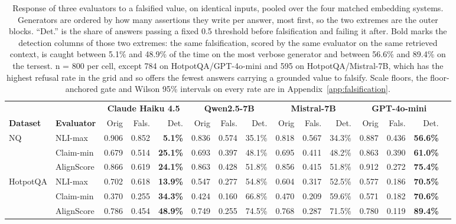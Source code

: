 \documentclass[11pt]{article}
\begin{document}
\begin{table}[t]
\centering
\footnotesize
\setlength{\tabcolsep}{4pt}
\begin{tabular}{llrrrrrrrrrrrrr}
\toprule
 & & \multicolumn{3}{c}{\textbf{Claude Haiku 4.5}} & \multicolumn{3}{c}{\textbf{Qwen2.5-7B}} & \multicolumn{3}{c}{\textbf{Mistral-7B}} & \multicolumn{3}{c}{\textbf{GPT-4o-mini}} \\
\cmidrule(lr){3-5}\cmidrule(lr){6-8}\cmidrule(lr){9-11}\cmidrule(lr){12-14}
\textbf{Dataset} & \textbf{Evaluator} & Orig & Fals. & Det. & Orig & Fals. & Det. & Orig & Fals. & Det. & Orig & Fals. & Det. \\
\midrule
NQ & NLI-max & 0.906 & 0.852 & \textbf{5.1\%} & 0.836 & 0.574 & 35.1\% & 0.818 & 0.567 & 34.3\% & 0.887 & 0.436 & \textbf{56.6\%} \\
 & Claim-min & 0.679 & 0.514 & \textbf{25.1\%} & 0.693 & 0.397 & 48.1\% & 0.695 & 0.411 & 48.2\% & 0.863 & 0.390 & \textbf{61.0\%} \\
 & AlignScore & 0.866 & 0.619 & \textbf{24.1\%} & 0.863 & 0.428 & 51.8\% & 0.856 & 0.415 & 51.8\% & 0.912 & 0.272 & \textbf{75.4\%} \\
\midrule
HotpotQA & NLI-max & 0.702 & 0.618 & \textbf{13.9\%} & 0.547 & 0.277 & 54.8\% & 0.604 & 0.317 & 52.5\% & 0.577 & 0.186 & \textbf{70.5\%} \\
 & Claim-min & 0.370 & 0.255 & \textbf{34.3\%} & 0.424 & 0.160 & 66.8\% & 0.470 & 0.209 & 59.6\% & 0.571 & 0.182 & \textbf{70.6\%} \\
 & AlignScore & 0.786 & 0.454 & \textbf{48.9\%} & 0.749 & 0.255 & 74.5\% & 0.768 & 0.287 & 71.5\% & 0.780 & 0.119 & \textbf{89.4\%} \\
\bottomrule
\end{tabular}
\caption{Response of three evaluators to a falsified value, on identical inputs, pooled over the four matched embedding systems. Generators are ordered by how many assertions they write per answer, most first, so the two extremes are the outer blocks. ``Det.'' is the share of answers passing a fixed 0.5 threshold before falsification and failing it after. Bold marks the detection columns of those two extremes: the same falsification, scored by the same evaluator on the same retrieved context, is caught between 5.1\% and 48.9\% of the time on the most verbose generator and between 56.6\% and 89.4\% on the tersest. n = 800 per cell, except 784 on HotpotQA/GPT-4o-mini and 595 on HotpotQA/Mistral-7B, which has the highest refusal rate in the grid and so offers the fewest answers carrying a grounded value to falsify. Scale floors, the floor-anchored gate and Wilson 95\% intervals on every rate are in Appendix~\ref{app:falsification}.}
\label{tab:2}
\end{table}
\end{document}

